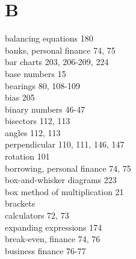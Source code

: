 \documentclass[10pt]{article}
\begin{document}
\section*{B}
balancing equations 180\\
banks, personal finance 74, 75\\
bar charts 203, 206-209, 224\\
base numbers 15\\
bearings 80, 108-109\\
bias 205\\
binary numbers 46-47\\
bisectors 112, 113\\
angles 112, 113\\
perpendicular 110, 111, 146, 147\\
rotation 101\\
borrowing, personal finance 74, 75\\
box-and-whisker diagrams 223\\
box method of multiplication 21\\
brackets\\
calculators 72, 73\\
expanding expressions 174\\
break-even, finance 74, 76\\
business finance 76-77
\end{document}

